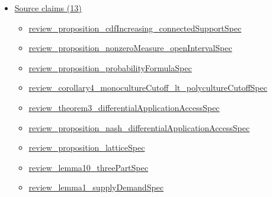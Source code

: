 \documentclass[10pt]{article}
\begin{document}
\begin{itemize}[leftmargin=1.2em]
\begin{itemize}[leftmargin=1.2em]
\item \hyperlink{paper-prerequisite-26aa95cb7c69a47b}{PG23\allowbreak{}Monoculture\allowbreak{}Matching.\allowbreak{}pg23\allowbreak{}Source\allowbreak{}Score\allowbreak{}Level\allowbreak{}Null}
\item \hyperlink{paper-prerequisite-18523c5d09938568}{PG23\allowbreak{}Monoculture\allowbreak{}Matching.\allowbreak{}pg23\allowbreak{}Source\allowbreak{}Stable\allowbreak{}Matching}
\item \hyperlink{paper-prerequisite-195a657989f6256f}{PG23\allowbreak{}Monoculture\allowbreak{}Matching.\allowbreak{}source\_\allowbreak{}assumption\_\allowbreak{}value\_\allowbreak{}threshold}
\end{itemize}
\item \hyperlink{source-section-f10b5f68e4acf3dc}{Source claims (13)}
\begin{itemize}[leftmargin=1.2em]
\item \hyperlink{source-claim-fb68d50156e6ff17}{review\_\allowbreak{}proposition\_\allowbreak{}cdf\allowbreak{}Increasing\_\allowbreak{}connected\allowbreak{}Support\allowbreak{}Spec}
\item \hyperlink{source-claim-f6924fab994f70b4}{review\_\allowbreak{}proposition\_\allowbreak{}nonzero\allowbreak{}Measure\_\allowbreak{}open\allowbreak{}Interval\allowbreak{}Spec}
\item \hyperlink{source-claim-65a7b194813893fe}{review\_\allowbreak{}proposition\_\allowbreak{}probability\allowbreak{}Formula\allowbreak{}Spec}
\item \hyperlink{source-claim-33a990cf61364541}{review\_\allowbreak{}corollary4\_\allowbreak{}monoculture\allowbreak{}Cutoff\_\allowbreak{}lt\_\allowbreak{}polyculture\allowbreak{}Cutoff\allowbreak{}Spec}
\item \hyperlink{source-claim-1c90e53a61fa6474}{review\_\allowbreak{}theorem3\_\allowbreak{}differential\allowbreak{}Application\allowbreak{}Access\allowbreak{}Spec}
\item \hyperlink{source-claim-e7728bad4731a7d0}{review\_\allowbreak{}proposition\_\allowbreak{}nash\_\allowbreak{}differential\allowbreak{}Application\allowbreak{}Access\allowbreak{}Spec}
\item \hyperlink{source-claim-47c2916d7eec1ab6}{review\_\allowbreak{}proposition\_\allowbreak{}lattice\allowbreak{}Spec}
\item \hyperlink{source-claim-e975bc2795ef7baf}{review\_\allowbreak{}lemma10\_\allowbreak{}three\allowbreak{}Part\allowbreak{}Spec}
\item \hyperlink{source-claim-380c644168b086fa}{review\_\allowbreak{}lemma1\_\allowbreak{}supply\allowbreak{}Demand\allowbreak{}Spec}

\end{itemize}
\end{itemize}
\end{document}
